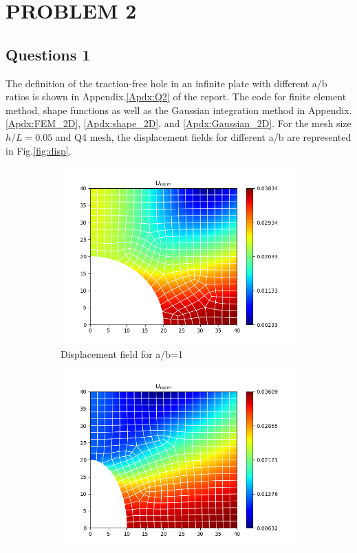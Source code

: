 \documentclass[twoside,twocolumn,10pt]{article}
\begin{document}
\section{\textbf{PROBLEM 2}}
\subsection{Questions 1}
The definition of the traction-free hole in an infinite plate with different a/b ratios is shown in Appendix.\ref{Apdx:Q2} of the report.
 The code for finite element method, shape functions as well as the Gaussian integration method in Appendix.\ref{Apdx:FEM_2D}, \ref{Apdx:shape_2D}, and \ref{Apdx:Gaussian_2D}. For the mesh size $h/L=0.05$ and Q4 mesh, the displacement fields for different a/b are represented in Fig.\ref{fig:disp}.

\begin{figure}[!ht]
  \centering
  \begin{subfigure}[c]{0.32\textwidth}
    \centering
    \includegraphics[width=1.\linewidth]{Q2_1/Q1_1_2_quad.png}
    \caption{Displacement field for a/b=1}
    \label{fig:disp_1}
  \end{subfigure} 
  \hfill
  \begin{subfigure}[c]{0.32\textwidth}
    \centering
    \includegraphics[width=1.\linewidth]{Q2_1/Q1_0.5_2_quad.png}

\end{subfigure}
\end{figure}
\end{document}
